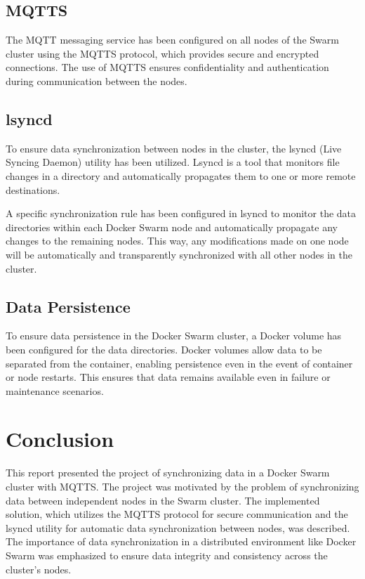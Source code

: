 \documentclass{article}
\begin{document}
\subsection{MQTTS}
The MQTT messaging service has been configured on all nodes of the Swarm cluster using 
the MQTTS protocol, which provides secure and encrypted connections. The use of MQTTS 
ensures confidentiality and authentication during communication between the nodes.

\subsection{lsyncd}
To ensure data synchronization between nodes in the cluster, the lsyncd (Live Syncing Daemon) 
utility has been utilized. Lsyncd is a tool that monitors file changes in a directory and 
automatically propagates them to one or more remote destinations.

A specific synchronization rule has been configured in lsyncd to monitor the data 
directories within each Docker Swarm node and automatically propagate any changes to 
the remaining nodes. This way, any modifications made on one node will be automatically 
and transparently synchronized with all other nodes in the cluster.

\subsection{Data Persistence}
To ensure data persistence in the Docker Swarm cluster, a Docker volume has been 
configured for the data directories. Docker volumes allow data to be separated from the 
container, enabling persistence even in the event of container or node restarts. 
This ensures that data remains available even in failure or maintenance scenarios.

\section{Conclusion}
This report presented the project of synchronizing data in a Docker Swarm cluster with MQTTS. 
The project was motivated by the problem of synchronizing data between independent nodes in 
the Swarm cluster. The implemented solution, which utilizes the MQTTS protocol for secure 
communication and the lsyncd utility for automatic data synchronization between nodes, was 
described. The importance of data synchronization in a distributed environment like Docker 
Swarm was emphasized to ensure data integrity and consistency across the cluster's nodes.
\end{document}
